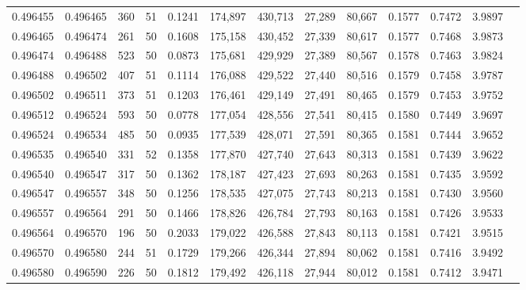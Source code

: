 \begin{tabular}{rrrrrrrrrrrrr}
0.496455 & 0.496465 & 360 &  51 &                                     0.1241 & 174,897 & 430,713 &  27,289 &  80,667 & 0.1577 & 0.7472 & 3.9897 \\
0.496465 & 0.496474 & 261 &  50 &                                     0.1608 & 175,158 & 430,452 &  27,339 &  80,617 & 0.1577 & 0.7468 & 3.9873 \\
0.496474 & 0.496488 & 523 &  50 &                                     0.0873 & 175,681 & 429,929 &  27,389 &  80,567 & 0.1578 & 0.7463 & 3.9824 \\
0.496488 & 0.496502 & 407 &  51 &                                     0.1114 & 176,088 & 429,522 &  27,440 &  80,516 & 0.1579 & 0.7458 & 3.9787 \\
0.496502 & 0.496511 & 373 &  51 &                                     0.1203 & 176,461 & 429,149 &  27,491 &  80,465 & 0.1579 & 0.7453 & 3.9752 \\
0.496512 & 0.496524 & 593 &  50 &                                     0.0778 & 177,054 & 428,556 &  27,541 &  80,415 & 0.1580 & 0.7449 & 3.9697 \\
0.496524 & 0.496534 & 485 &  50 &                                     0.0935 & 177,539 & 428,071 &  27,591 &  80,365 & 0.1581 & 0.7444 & 3.9652 \\
0.496535 & 0.496540 & 331 &  52 &                                     0.1358 & 177,870 & 427,740 &  27,643 &  80,313 & 0.1581 & 0.7439 & 3.9622 \\
0.496540 & 0.496547 & 317 &  50 &                                     0.1362 & 178,187 & 427,423 &  27,693 &  80,263 & 0.1581 & 0.7435 & 3.9592 \\
0.496547 & 0.496557 & 348 &  50 &                                     0.1256 & 178,535 & 427,075 &  27,743 &  80,213 & 0.1581 & 0.7430 & 3.9560 \\
0.496557 & 0.496564 & 291 &  50 &                                     0.1466 & 178,826 & 426,784 &  27,793 &  80,163 & 0.1581 & 0.7426 & 3.9533 \\
0.496564 & 0.496570 & 196 &  50 &                                     0.2033 & 179,022 & 426,588 &  27,843 &  80,113 & 0.1581 & 0.7421 & 3.9515 \\
0.496570 & 0.496580 & 244 &  51 &                                     0.1729 & 179,266 & 426,344 &  27,894 &  80,062 & 0.1581 & 0.7416 & 3.9492 \\
0.496580 & 0.496590 & 226 &  50 &                                     0.1812 & 179,492 & 426,118 &  27,944 &  80,012 & 0.1581 & 0.7412 & 3.9471 \\

\end{tabular}
